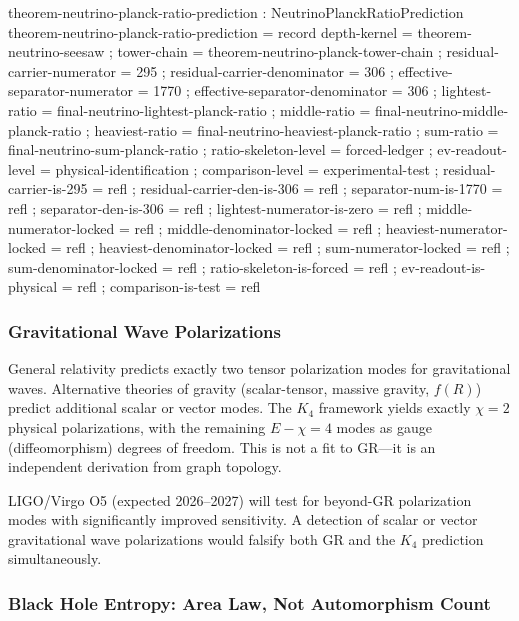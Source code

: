 \documentclass[11pt,a4paper]{book}
\begin{document}
\begin{code}
theorem-neutrino-planck-ratio-prediction : NeutrinoPlanckRatioPrediction
theorem-neutrino-planck-ratio-prediction = record
  { depth-kernel                  = theorem-neutrino-seesaw
  ; tower-chain                   = theorem-neutrino-planck-tower-chain
  ; residual-carrier-numerator    = 295
  ; residual-carrier-denominator  = 306
  ; effective-separator-numerator = 1770
  ; effective-separator-denominator = 306
  ; lightest-ratio                = final-neutrino-lightest-planck-ratio
  ; middle-ratio                  = final-neutrino-middle-planck-ratio
  ; heaviest-ratio                = final-neutrino-heaviest-planck-ratio
  ; sum-ratio                     = final-neutrino-sum-planck-ratio
  ; ratio-skeleton-level          = forced-ledger
  ; ev-readout-level              = physical-identification
  ; comparison-level              = experimental-test
  ; residual-carrier-is-295       = refl
  ; residual-carrier-den-is-306   = refl
  ; separator-num-is-1770         = refl
  ; separator-den-is-306          = refl
  ; lightest-numerator-is-zero    = refl
  ; middle-numerator-locked       = refl
  ; middle-denominator-locked     = refl
  ; heaviest-numerator-locked     = refl
  ; heaviest-denominator-locked   = refl
  ; sum-numerator-locked          = refl
  ; sum-denominator-locked        = refl
  ; ratio-skeleton-is-forced      = refl
  ; ev-readout-is-physical        = refl
  ; comparison-is-test            = refl }
\end{code}

\subsubsection*{Gravitational Wave Polarizations}

General relativity predicts exactly two tensor polarization modes for gravitational waves. Alternative theories of gravity (scalar-tensor, massive gravity, $f(R)$) predict additional scalar or vector modes. The $K_4$ framework yields exactly $\chi = 2$ physical polarizations, with the remaining $E - \chi = 4$ modes as gauge (diffeomorphism) degrees of freedom. This is not a fit to GR---it is an independent derivation from graph topology.

LIGO/Virgo O5 (expected 2026--2027) will test for beyond-GR polarization modes with significantly improved sensitivity. A detection of scalar or vector gravitational wave polarizations would falsify both GR and the $K_4$ prediction simultaneously.

\subsubsection*{Black Hole Entropy: Area Law, Not Automorphism Count}
\end{document}
